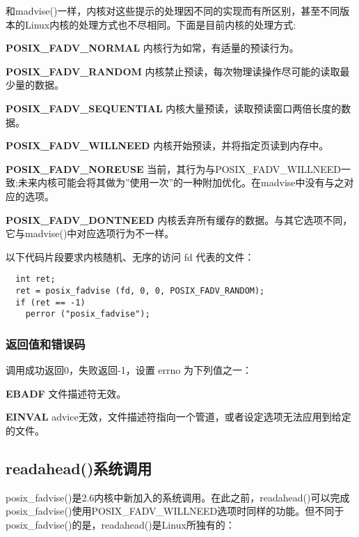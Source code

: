 和madvise()一样，内核对这些提示的处理因不同的实现而有所区别，甚至不同版本的Linux内核的处理方式也不尽相同。下面是目前内核的处理方式:

\begin{eqlist*}
\item[\textbf{POSIX\_FADV\_NORMAL}] 内核行为如常，有适量的预读行为。
\item[\textbf{POSIX\_FADV\_RANDOM}] 内核禁止预读，每次物理读操作尽可能的读取最少量的数据。
\item[\textbf{POSIX\_FADV\_SEQUENTIAL}] 内核大量预读，读取预读窗口两倍长度的数据。
\item[\textbf{POSIX\_FADV\_WILLNEED}] 内核开始预读，并将指定页读到内存中。
\item[\textbf{POSIX\_FADV\_NOREUSE}] 当前，其行为与POSIX\_FADV\_WILLNEED一致;未来内核可能会将其做为''使用一次''的一种附加优化。在madvise中没有与之对应的选项。
\item[\textbf{POSIX\_FADV\_DONTNEED}] 内核丢弃所有缓存的数据。与其它选项不同，它与madvise()中对应选项行为不一样。
\end{eqlist*}

以下代码片段要求内核随机、无序的访问 fd 代表的文件：

\begin{lstlisting}
  int ret;
  ret = posix_fadvise (fd, 0, 0, POSIX_FADV_RANDOM);
  if (ret == -1)
    perror ("posix_fadvise");
\end{lstlisting}

\subsubsection{返回值和错误码}

调用成功返回0，失败返回-1，设置 errno 为下列值之一：

\begin{eqlist*}
\item[\textbf{EBADF}] 文件描述符无效。
\item [\textbf{EINVAL}] advice无效，文件描述符指向一个管道，或者设定选项无法应用到给定的文件。
\end{eqlist*}

\subsection{readahead()系统调用}

posix\_fadvise()是2.6内核中新加入的系统调用。在此之前，readahead()可以完成posix\_fadvise()使用POSIX\_FADV\_WILLNEED选项时同样的功能。但不同于posix\_fadvise()的是，readahead()是Linux所独有的：

